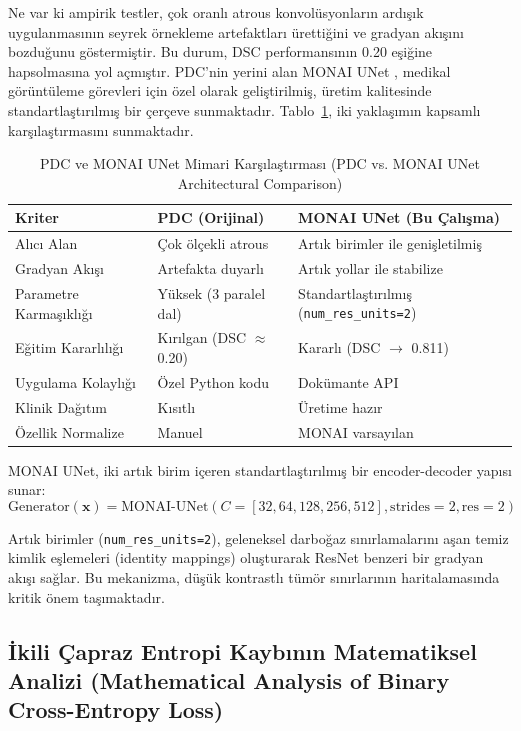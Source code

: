 \documentclass[10pt,journal,compsoc]{IEEEtran}
\begin{document}
Ne var ki ampirik testler, çok oranlı atrous konvolüsyonların ardışık uygulanmasının seyrek örnekleme artefaktları ürettiğini ve gradyan akışını bozduğunu göstermiştir. Bu durum, DSC performansının 0.20 eşiğine hapsolmasına yol açmıştır. PDC'nin yerini alan MONAI UNet \cite{monai}, medikal görüntüleme görevleri için özel olarak geliştirilmiş, üretim kalitesinde standartlaştırılmış bir çerçeve sunmaktadır. Tablo~\ref{tab:comparison}, iki yaklaşımın kapsamlı karşılaştırmasını sunmaktadır.

\begin{table}[htbp]
\centering
\caption{PDC ve MONAI UNet Mimari Karşılaştırması \textnormal{\small{(PDC vs. MONAI UNet Architectural Comparison)}}}
\label{tab:comparison}
\setlength{\tabcolsep}{4pt}
\begin{tabular}{@{}p{2.3cm}p{2.5cm}p{2.5cm}@{}}
\toprule
\textbf{Kriter} & \textbf{PDC (Orijinal)} & \textbf{MONAI UNet (Bu Çalışma)} \\
\midrule
Alıcı Alan & Çok ölçekli atrous & Artık birimler ile genişletilmiş \\
Gradyan Akışı & Artefakta duyarlı & Artık yollar ile stabilize \\
Parametre Karmaşıklığı & Yüksek (3 paralel dal) & Standartlaştırılmış (\texttt{num\_res\_units=2}) \\
Eğitim Kararlılığı & Kırılgan (DSC $\approx$ 0.20) & Kararlı (DSC $\rightarrow$ 0.811) \\
Uygulama Kolaylığı & Özel Python kodu & Dokümante API \\
Klinik Dağıtım & Kısıtlı & Üretime hazır \\
Özellik Normalize & Manuel & MONAI varsayılan \\
\bottomrule
\end{tabular}
\end{table}

MONAI UNet, iki artık birim içeren standartlaştırılmış bir encoder-decoder yapısı sunar:
\begin{equation}
\text{Generator}(\mathbf{x}) = \text{MONAI-UNet}(C=[32,64,128,256,512], \text{strides}=2, \text{res}=2)
\end{equation}

Artık birimler (\texttt{num\_res\_units=2}), geleneksel darboğaz sınırlamalarını aşan temiz kimlik eşlemeleri (identity mappings) oluşturarak ResNet benzeri bir gradyan akışı sağlar. Bu mekanizma, düşük kontrastlı tümör sınırlarının haritalamasında kritik önem taşımaktadır.

\subsection{İkili Çapraz Entropi Kaybının Matematiksel Analizi \textnormal{\small{(Mathematical Analysis of Binary Cross-Entropy Loss)}}}
\end{document}
